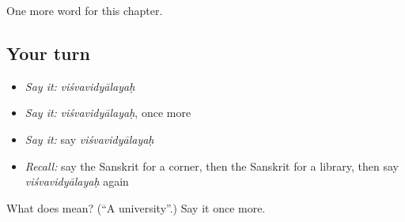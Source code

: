 \begin{grammarlens}[title={What you've built}]
One more word for this chapter.
\end{grammarlens}

\subsection*{Your turn}
\begin{itemize}
\raggedright
  \item \emph{Say it:} \emph{viśvavidyālayaḥ}
  \item \emph{Say it:} \emph{viśvavidyālayaḥ}, once more
  \item \emph{Say it:} say \emph{viśvavidyālayaḥ}
  \item \emph{Recall:} say the Sanskrit for a corner, then the Sanskrit for a library, then say \emph{viśvavidyālayaḥ} again
\end{itemize}

\begin{tcolorbox}[breakable,colback=teal!4,colframe=teal!35!black,title={Before you move on}]
What does  mean? (\textquotedblleft{}A university\textquotedblright{}.) Say it once more.
\end{tcolorbox}
